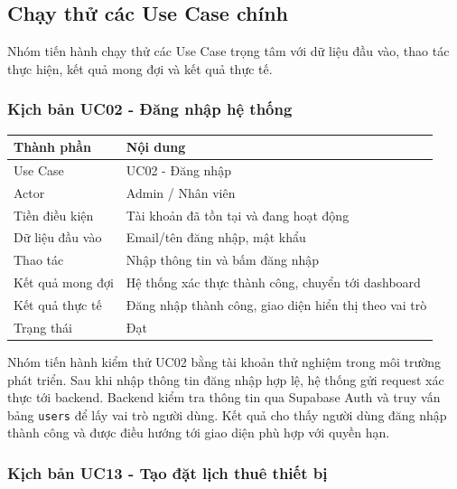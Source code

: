 \subsection{Chạy thử các Use Case chính}

Nhóm tiến hành chạy thử các Use Case trọng tâm với dữ liệu đầu vào, thao tác thực hiện, kết quả mong đợi và kết quả thực tế.

\subsubsection{Kịch bản UC02 - Đăng nhập hệ thống}

\begin{table}[H]
	\centering
	\begin{tabularx}{\textwidth}{|l|X|}
		\hline
		\textbf{Thành phần} & \textbf{Nội dung} \\
		\hline
		Use Case & UC02 - Đăng nhập \\
		\hline
		Actor & Admin / Nhân viên \\
		\hline
		Tiền điều kiện & Tài khoản đã tồn tại và đang hoạt động \\
		\hline
		Dữ liệu đầu vào & Email/tên đăng nhập, mật khẩu \\
		\hline
		Thao tác & Nhập thông tin và bấm đăng nhập \\
		\hline
		Kết quả mong đợi & Hệ thống xác thực thành công, chuyển tới dashboard \\
		\hline
		Kết quả thực tế & Đăng nhập thành công, giao diện hiển thị theo vai trò \\
		\hline
		Trạng thái & Đạt \\
		\hline
	\end{tabularx}
\end{table}

Nhóm tiến hành kiểm thử UC02 bằng tài khoản thử nghiệm trong môi trường phát triển. Sau khi nhập thông tin đăng nhập hợp lệ, hệ thống gửi request xác thực tới backend. Backend kiểm tra thông tin qua Supabase Auth và truy vấn bảng \texttt{users} để lấy vai trò người dùng. Kết quả cho thấy người dùng đăng nhập thành công và được điều hướng tới giao diện phù hợp với quyền hạn.

\subsubsection{Kịch bản UC13 - Tạo đặt lịch thuê thiết bị}

